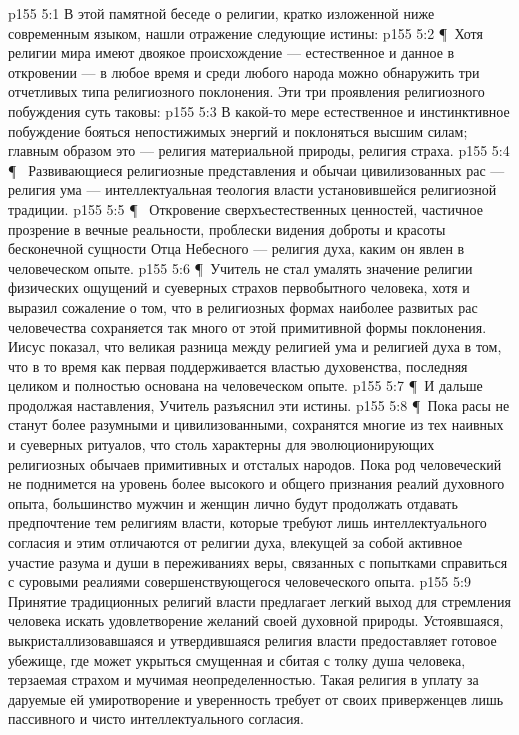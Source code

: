 \vs p155 5:1 В этой памятной беседе о религии, кратко изложенной ниже современным языком, нашли отражение следующие истины:
\vs p155 5:2 \P\ Хотя религии мира имеют двоякое происхождение --- естественное и данное в откровении --- в любое время и среди любого народа можно обнаружить три отчетливых типа религиозного поклонения. Эти три проявления религиозного побуждения суть таковы:
\vs p155 5:3 \bibnobreakspace {} В какой\hyp{}то мере естественное и инстинктивное побуждение бояться непостижимых энергий и поклоняться высшим силам; главным образом это --- религия материальной природы, религия страха.
\vs p155 5:4 \P\ \bibnobreakspace {} Развивающиеся религиозные представления и обычаи цивилизованных рас --- религия ума --- интеллектуальная теология власти установившейся религиозной традиции.
\vs p155 5:5 \P\ \bibnobreakspace {} Откровение сверхъестественных ценностей, частичное прозрение в вечные реальности, проблески видения доброты и красоты бесконечной сущности Отца Небесного --- религия духа, каким он явлен в человеческом опыте.
\vs p155 5:6 \P\ Учитель не стал умалять значение религии физических ощущений и суеверных страхов первобытного человека, хотя и выразил сожаление о том, что в религиозных формах наиболее развитых рас человечества сохраняется так много от этой примитивной формы поклонения. Иисус показал, что великая разница между религией ума и религией духа в том, что в то время как первая поддерживается властью духовенства, последняя целиком и полностью основана на человеческом опыте.
\vs p155 5:7 \P\ И дальше продолжая наставления, Учитель разъяснил эти истины.
\vs p155 5:8 \P\ Пока расы не станут более разумными и цивилизованными, сохранятся многие из тех наивных и суеверных ритуалов, что столь характерны для эволюционирующих религиозных обычаев примитивных и отсталых народов. Пока род человеческий не поднимется на уровень более высокого и общего признания реалий духовного опыта, большинство мужчин и женщин лично будут продолжать отдавать предпочтение тем религиям власти, которые требуют лишь интеллектуального согласия и этим отличаются от религии духа, влекущей за собой активное участие разума и души в переживаниях веры, связанных с попытками справиться с суровыми реалиями совершенствующегося человеческого опыта.
\vs p155 5:9 Принятие традиционных религий власти предлагает легкий выход для стремления человека искать удовлетворение желаний своей духовной природы. Устоявшаяся, выкристаллизовавшаяся и утвердившаяся религия власти предоставляет готовое убежище, где может укрыться смущенная и сбитая с толку душа человека, терзаемая страхом и мучимая неопределенностью. Такая религия в уплату за даруемые ей умиротворение и уверенность требует от своих приверженцев лишь пассивного и чисто интеллектуального согласия.
